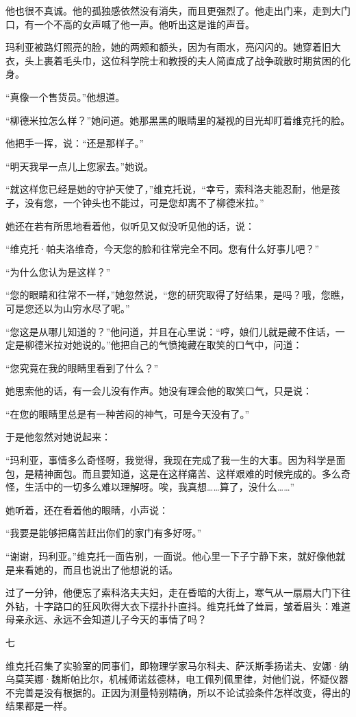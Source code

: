 他也很不真诚。他的孤独感依然没有消失，而且更强烈了。他走出门来，走到大门口，有一个不高的女声喊了他一声。他听出这是谁的声音。

玛利亚被路灯照亮的脸，她的两颊和额头，因为有雨水，亮闪闪的。她穿着旧大衣，头上裹着毛头巾，这位科学院士和教授的夫人简直成了战争疏散时期贫困的化身。

“真像一个售货员。”他想道。

“柳德米拉怎么样？”她问道。她那黑黑的眼睛里的凝视的目光却盯着维克托的脸。

他把手一挥，说：“还是那样子。”

“明天我早一点儿上您家去。”她说。

“就这样您已经是她的守护天使了，”维克托说，“幸亏，索科洛夫能忍耐，他是孩子，没有您，一个钟头也不能过，可是您却离不了柳德米拉。”

她还在若有所思地看着他，似听见又似没听见他的话，说：

“维克托·帕夫洛维奇，今天您的脸和往常完全不同。您有什么好事儿吧？”

“为什么您认为是这样？”

“您的眼睛和往常不一样，”她忽然说，“您的研究取得了好结果，是吗？哦，您瞧，可是您还以为山穷水尽了呢。”

“您这是从哪儿知道的？”他问道，并且在心里说：“哼，娘们儿就是藏不住话，一定是柳德米拉对她说的。”他把自己的气愤掩藏在取笑的口气中，问道：

“您究竟在我的眼睛里看到了什么？”

她思索他的话，有一会儿没有作声。她没有理会他的取笑口气，只是说：

“在您的眼睛里总是有一种苦闷的神气，可是今天没有了。”

于是他忽然对她说起来：

“玛利亚，事情多么奇怪呀，我觉得，我现在完成了我一生的大事。因为科学是面包，是精神面包。而且要知道，这是在这样痛苦、这样艰难的时候完成的。多么奇怪，生活中的一切多么难以理解呀。唉，我真想……算了，没什么……”

她听着，还在看着他的眼睛，小声说：

“我要是能够把痛苦赶出你们的家门有多好呀。”

“谢谢，玛利亚。”维克托一面告别，一面说。他心里一下子宁静下来，就好像他就是来看她的，而且也说出了他想说的话。

过了一分钟，他便忘了索科洛夫夫妇，走在昏暗的大街上，寒气从一扇扇大门下往外钻，十字路口的狂风吹得大衣下摆扑扑直抖。维克托耸了耸肩，皱着眉头：难道母亲永远、永远不会知道儿子今天的事情了吗？

七

维克托召集了实验室的同事们，即物理学家马尔科夫、萨沃斯季扬诺夫、安娜·纳乌莫芙娜·魏斯帕比尔，机械师诺兹德林，电工佩列佩里律，対他们说，怀疑仪器不完善是没有根据的。正因为测量特别精确，所以不论试验条件怎样改变，得出的结果都是一样。

